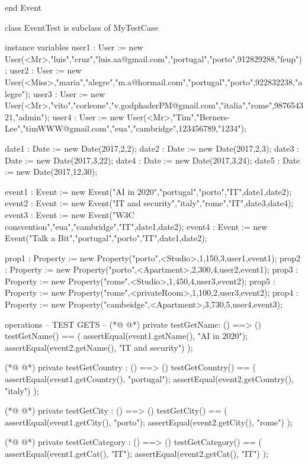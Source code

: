 \begin{vdmpp}[breaklines=true]
 

end Event

class EventTest is subclass of MyTestCase

instance variables
 user1 : User := new User(<Mr>,"luis","cruz","luis.aa@gmail.com","portugal","porto",912829288,"feup");
 user2 : User := new User(<Miss>,"maria","alegre","m.a@hormail.com","portugal","porto",922832238,"alegre");
 user3 : User := new User(<Mr>,"vito","corleone","v.godphaderPM@gmail.com","italia","rome",987654321,"admin");
 user4 : User := new User(<Mr>,"Tim","Berners-Lee","timWWW@gmail.com","eua","cambridge",123456789,"1234");
 
 date1 : Date := new Date(2017,2,2);
 date2 : Date := new Date(2017,2,3);
 date3 : Date := new Date(2017,3,22);
 date4 : Date := new Date(2017,3,24);
 date5 : Date := new Date(2017,12,30);
 
 event1 : Event := new Event("AI in 2020","portugal","porto","IT",date1,date2);
 event2 : Event := new Event("IT and security","italy","rome","IT",date3,date4);
 event3 : Event := new Event("W3C consvention","eua","cambridge","IT",date1,date2);
 event4 : Event := new Event("Talk a Bit","portugal","porto","IT",date1,date2);
 
 prop1 : Property := new Property("porto",<Studio>,1,150,3,user1,event1);
 prop2 : Property := new Property("porto",<Apartment>,2,300,4,user2,event1);
 prop3 : Property := new Property("rome",<Studio>,1,450,4,user3,event2);
 prop5 : Property := new Property("rome",<privateRoom>,1,100,2,user3,event2);
 prop4 : Property := new Property("cambeidge",<Apartment>,3,730,5,user4,event3);
 

operations
-- TEST GETS --
(*@
\label{testGetName:107}
@*)
 private testGetName: () ==> ()
  testGetName() == 
  (
   assertEqual(event1.getName(), "AI in 2020");
   assertEqual(event2.getName(), "IT and security")
  );
  
(*@
\label{testGetCountry:114}
@*)
 private testGetCountry : () ==> ()
  testGetCountry() == 
  (
   assertEqual(event1.getCountry(), "portugal");
   assertEqual(event2.getCountry(), "italy")
  );
 
(*@
\label{testGetCity:121}
@*)
 private testGetCity : () ==> ()
  testGetCity() == 
  (
   assertEqual(event1.getCity(), "porto");
   assertEqual(event2.getCity(), "rome")
  );
 
(*@
\label{testGetCategory:128}
@*)
 private testGetCategory : () ==> ()
  testGetCategory() == 
  (
   assertEqual(event1.getCat(), "IT");
   assertEqual(event2.getCat(), "IT")
  );
  

\end{vdmpp}
